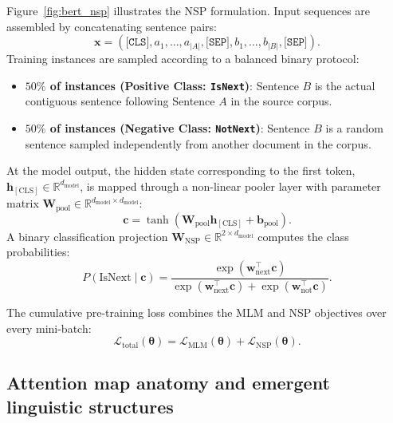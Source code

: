 \documentclass[../../../main.tex]{subfiles}
\begin{document}
Figure~\ref{fig:bert_nsp} illustrates the NSP formulation. Input sequences are assembled by concatenating sentence pairs:
\begin{equation}
\mathbf{x} = (\texttt{[CLS]}, a_1, \dots, a_{|A|}, \texttt{[SEP]}, b_1, \dots, b_{|B|}, \texttt{[SEP]}).
\end{equation}
Training instances are sampled according to a balanced binary protocol:
\begin{itemize}
    \item \textbf{$50\%$ of instances (Positive Class: \texttt{IsNext})}: Sentence $B$ is the actual contiguous sentence following Sentence $A$ in the source corpus.
    \item \textbf{$50\%$ of instances (Negative Class: \texttt{NotNext})}: Sentence $B$ is a random sentence sampled independently from another document in the corpus.
\end{itemize}

At the model output, the hidden state corresponding to the first token, $\mathbf{h}_{[\text{CLS}]} \in \mathbb{R}^{d_{\text{model}}}$, is mapped through a non-linear pooler layer with parameter matrix $\mathbf{W}_{\text{pool}} \in \mathbb{R}^{d_{\text{model}} \times d_{\text{model}}}$:
\begin{equation}
\mathbf{c} = \tanh(\mathbf{W}_{\text{pool}} \mathbf{h}_{[\text{CLS}]} + \mathbf{b}_{\text{pool}}).
\label{eq:bert_pooled_cls_representation}
\end{equation}
A binary classification projection $\mathbf{W}_{\text{NSP}} \in \mathbb{R}^{2 \times d_{\text{model}}}$ computes the class probabilities:
\begin{equation}
P(\text{IsNext} \mid \mathbf{c}) = \frac{\exp(\mathbf{w}_{\text{next}}^\top \mathbf{c})}{\exp(\mathbf{w}_{\text{next}}^\top \mathbf{c}) + \exp(\mathbf{w}_{\text{not}}^\top \mathbf{c})}.
\label{eq:bert_nsp_probability}
\end{equation}

The cumulative pre-training loss combines the MLM and NSP objectives over every mini-batch:
\begin{equation}
\mathcal{L}_{\text{total}}(\boldsymbol{\theta}) = \mathcal{L}_{\text{MLM}}(\boldsymbol{\theta}) + \mathcal{L}_{\text{NSP}}(\boldsymbol{\theta}).
\label{eq:bert_total_pretraining_objective}
\end{equation}


\subsection{Attention map anatomy and emergent linguistic structures}
\label{subsec:bert_attention_map_anatomy}
\end{document}
